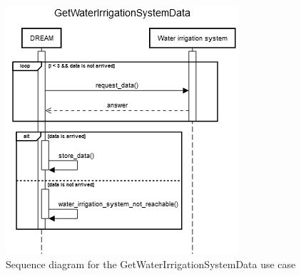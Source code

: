 \documentclass{article}
\begin{document}
\begin{figure}[H]
    \centering
    \includegraphics[scale=0.75]{sequence_diagrams/GetWaterIrrigationSystemData}
    \caption{Sequence diagram for the GetWaterIrrigationSystemData use case}
\end{figure}


\end{document}
